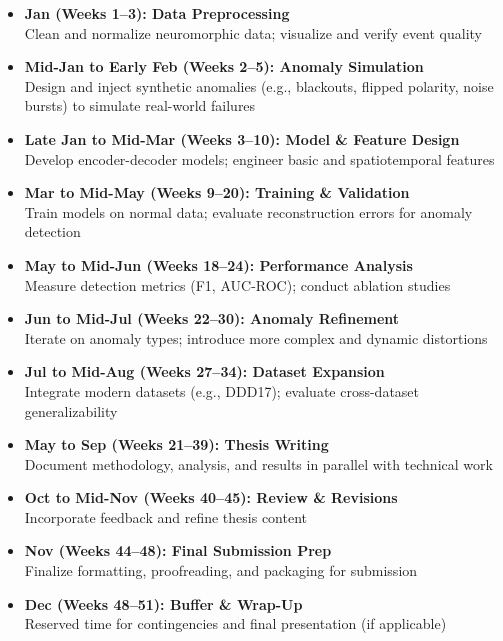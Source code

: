 \documentclass[12pt,a4paper]{article}
\begin{document}
\begin{itemize}
    \item \textbf{Jan (Weeks 1--3): Data Preprocessing} \\
          Clean and normalize neuromorphic data; visualize and verify event quality
    \item \textbf{Mid-Jan to Early Feb (Weeks 2--5): Anomaly Simulation} \\
          Design and inject synthetic anomalies (e.g., blackouts, flipped polarity, noise bursts) to simulate real-world failures
    \item \textbf{Late Jan to Mid-Mar (Weeks 3--10): Model \& Feature Design} \\
          Develop encoder-decoder models; engineer basic and spatiotemporal features
    \item \textbf{Mar to Mid-May (Weeks 9--20): Training \& Validation} \\
          Train models on normal data; evaluate reconstruction errors for anomaly detection
    \item \textbf{May to Mid-Jun (Weeks 18--24): Performance Analysis} \\
          Measure detection metrics (F1, AUC-ROC); conduct ablation studies
    \item \textbf{Jun to Mid-Jul (Weeks 22--30): Anomaly Refinement} \\
          Iterate on anomaly types; introduce more complex and dynamic distortions
    \item \textbf{Jul to Mid-Aug (Weeks 27--34): Dataset Expansion} \\
          Integrate modern datasets (e.g., DDD17); evaluate cross-dataset generalizability
    \item \textbf{May to Sep (Weeks 21--39): Thesis Writing} \\
          Document methodology, analysis, and results in parallel with technical work
    \item \textbf{Oct to Mid-Nov (Weeks 40--45): Review \& Revisions} \\
          Incorporate feedback and refine thesis content
    \item \textbf{Nov (Weeks 44--48): Final Submission Prep} \\
          Finalize formatting, proofreading, and packaging for submission
    \item \textbf{Dec (Weeks 48--51): Buffer \& Wrap-Up} \\
          Reserved time for contingencies and final presentation (if applicable)
\end{itemize}
\end{document}
